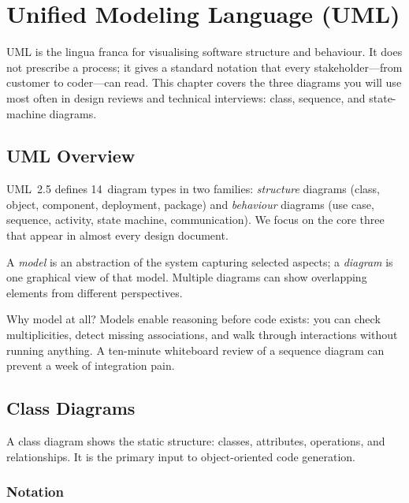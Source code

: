 \chapter{Unified Modeling Language (UML)}
\label{ch:uml}

UML is the lingua franca for visualising software structure and behaviour. It does not prescribe a process; it gives a standard notation that every stakeholder---from customer to coder---can read. This chapter covers the three diagrams you will use most often in design reviews and technical interviews: class, sequence, and state-machine diagrams.

\section{UML Overview}

UML~2.5 defines 14~diagram types in two families: \emph{structure} diagrams (class, object, component, deployment, package) and \emph{behaviour} diagrams (use case, sequence, activity, state machine, communication). We focus on the core three that appear in almost every design document.

\begin{definition}
A \emph{model} is an abstraction of the system capturing selected aspects; a \emph{diagram} is one graphical view of that model. Multiple diagrams can show overlapping elements from different perspectives.
\end{definition}

Why model at all? Models enable reasoning before code exists: you can check multiplicities, detect missing associations, and walk through interactions without running anything. A ten-minute whiteboard review of a sequence diagram can prevent a week of integration pain.

\section{Class Diagrams}

A class diagram shows the static structure: classes, attributes, operations, and relationships. It is the primary input to object-oriented code generation.

\subsection{Notation}


